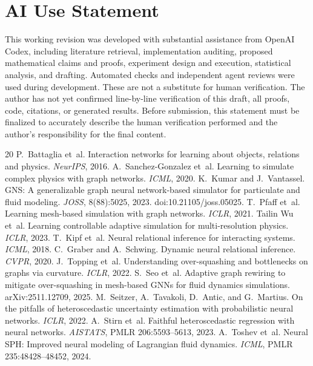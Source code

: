 \section*{AI Use Statement}
This working revision was developed with substantial assistance from OpenAI Codex, including literature retrieval, implementation auditing, proposed mathematical claims and proofs, experiment design and execution, statistical analysis, and drafting. Automated checks and independent agent reviews were used during development. These are not a substitute for human verification. The author has not yet confirmed line-by-line verification of this draft, all proofs, code, citations, or generated results. Before submission, this statement must be finalized to accurately describe the human verification performed and the author's responsibility for the final content.

\begin{thebibliography}{20}
 P.~Battaglia et~al. Interaction networks for learning about objects, relations and physics. \emph{NeurIPS}, 2016.
 A.~Sanchez-Gonzalez et~al. Learning to simulate complex physics with graph networks. \emph{ICML}, 2020.
 K.~Kumar and J.~Vantassel. GNS: A generalizable graph neural network-based simulator for particulate and fluid modeling. \emph{JOSS}, 8(88):5025, 2023. doi:10.21105/joss.05025.
 T.~Pfaff et~al. Learning mesh-based simulation with graph networks. \emph{ICLR}, 2021.
 Tailin Wu et~al. Learning controllable adaptive simulation for multi-resolution physics. \emph{ICLR}, 2023.
 T.~Kipf et~al. Neural relational inference for interacting systems. \emph{ICML}, 2018.
 C.~Graber and A.~Schwing. Dynamic neural relational inference. \emph{CVPR}, 2020.
 J.~Topping et~al. Understanding over-squashing and bottlenecks on graphs via curvature. \emph{ICLR}, 2022.
 S.~Seo et~al. Adaptive graph rewiring to mitigate over-squashing in mesh-based GNNs for fluid dynamics simulations. arXiv:2511.12709, 2025.
 M.~Seitzer, A.~Tavakoli, D.~Antic, and G.~Martius. On the pitfalls of heteroscedastic uncertainty estimation with probabilistic neural networks. \emph{ICLR}, 2022.
 A.~Stirn et~al. Faithful heteroscedastic regression with neural networks. \emph{AISTATS}, PMLR 206:5593--5613, 2023.
 A.~Toshev et~al. Neural SPH: Improved neural modeling of Lagrangian fluid dynamics. \emph{ICML}, PMLR 235:48428--48452, 2024.
\end{thebibliography}

